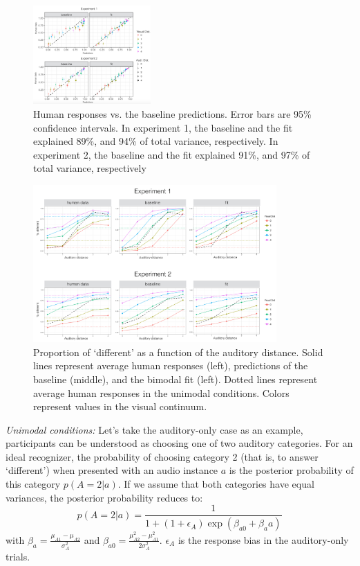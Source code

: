 \documentclass[10pt,letterpaper]{article}
\begin{document}
\begin{figure}[h]
\centering
\includegraphics[width=0.4\textwidth]{correlation.png}
\caption{Human responses vs. the baseline predictions. Error bars are 95\% confidence intervals. In experiment 1, the baseline and the fit explained 89\%, and 94\% of total variance, respectively. In experiment 2, the baseline and the fit explained 91\%, and 97\% of total variance, respectively}
\label{fig:corr}
\end{figure}

\begin{figure}
\centering
\includegraphics[width=0.83\textwidth]{Exp.png}
\caption{Proportion of `different' as a function of the auditory distance. Solid lines represent average human responses (left), predictions of the baseline (middle), and the bimodal fit (left). Dotted lines represent average human responses in the unimodal conditions. Colors represent values in the visual continuum. }
\label{fig:Exp}
\end{figure}

\textit{Unimodal conditions:} Let's take the auditory-only case as an example, participants can be understood as choosing one of two auditory categories. For an ideal recognizer, the probability of choosing category 2 (that is, to answer `different') when presented with an audio instance $a$ is the posterior probability of this category $p(A=2|a)$. If we assume that both categories have equal variances, the posterior probability reduces to:
\begin{equation}
p(A=2 | a)=\frac{1}{1+(1+\epsilon_A)\exp(\beta_{a0}+\beta_aa)}
\end{equation}
with $\beta_a=\frac{\mu_{A1}-\mu_{A2}}{\sigma^2_{A}}$ and  $\beta_{a0}=\frac{\mu^2_{A2}-\mu^2_{A1}}{2\sigma^2_{A}}$. $\epsilon_A$ is the response bias in the auditory-only trials.
\end{document}
